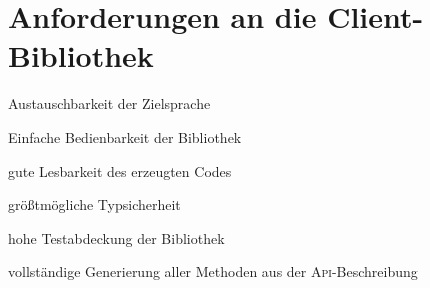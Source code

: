 
\section{Anforderungen an die Client-Bibliothek}
\label{item:requirements}

\begin{compactitem}
    \item Austauschbarkeit der Zielsprache
    \item Einfache Bedienbarkeit der Bibliothek
    \item gute Lesbarkeit des erzeugten Codes
    \item größtmögliche Typsicherheit
    \item hohe Testabdeckung der Bibliothek
    \item vollständige Generierung aller Methoden aus der \textsc{Api}-Beschreibung
\end{compactitem}